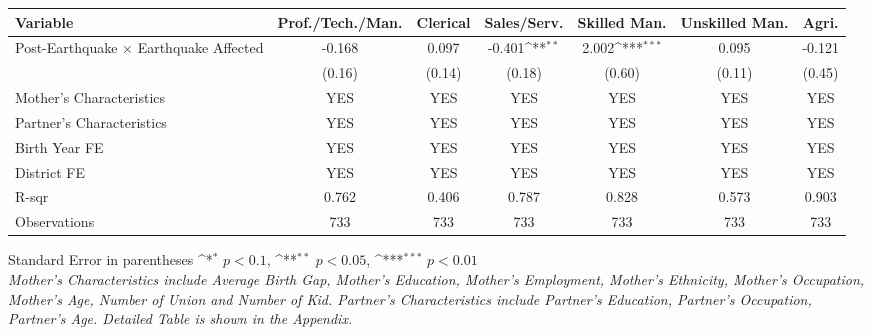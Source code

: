 \def\sym#1{\ifmmode^{#1}\else\(^{#1}\)\fi}
\renewcommand{\arraystretch}{1.4}
\small
\setlength{\tabcolsep}{6pt}

\begin{flushleft}
\begin{tabular}{@{}p{2.5cm}*{6}{c}@{}}
\hline\hline
Variable & Prof./Tech./Man. & Clerical & Sales/Serv. & Skilled Man. & Unskilled Man. & Agri. \\
\hline
Post-Earthquake × Earthquake Affected & -0.168 & 0.097 & -0.401\sym{**} & 2.002\sym{***} & 0.095 & -0.121 \\
                                      & (0.16) & (0.14) & (0.18) & (0.60) & (0.11) & (0.45) \\
\hline
Mother's Characteristics              & YES & YES & YES & YES & YES & YES \\
Partner's Characteristics             & YES & YES & YES & YES & YES & YES \\
\hline
Birth Year FE                         & YES & YES & YES & YES & YES & YES \\
District FE                           & YES & YES & YES & YES & YES & YES \\
R-sqr                                 & 0.762 & 0.406 & 0.787 & 0.828 & 0.573 & 0.903 \\
Observations                          & 733 & 733 & 733 & 733 & 733 & 733 \\
\hline\hline
\end{tabular}

\vspace{4pt}
\noindent\footnotesize
Standard Error in parentheses \sym{*} \(p<0.1\), \sym{**} \(p<0.05\), \sym{***} \(p<0.01\)\\
\textit{Mother’s Characteristics include Average Birth Gap, Mother’s Education, Mother’s Employment, Mother’s Ethnicity, Mother’s Occupation, Mother’s Age, Number of Union and Number of Kid. Partner’s Characteristics include Partner’s Education, Partner’s Occupation, Partner’s Age. Detailed Table is shown in the Appendix.}
\end{flushleft}
